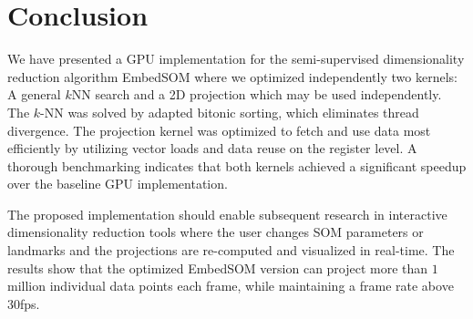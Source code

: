 \section{Conclusion}\label{sec:outro}

We have presented a GPU implementation for the semi-supervised dimensionality reduction algorithm EmbedSOM where we optimized independently two kernels: A general $k$NN search and a 2D projection which may be used independently. The $k$-NN was solved by adapted bitonic sorting, which eliminates thread divergence. The projection kernel was optimized to fetch and use data most efficiently by utilizing vector loads and data reuse on the register level. A thorough benchmarking indicates that both kernels achieved a significant speedup over the baseline GPU implementation.

The proposed implementation should enable subsequent research in interactive dimensionality reduction tools where the user changes SOM parameters or landmarks and the projections are re-computed and visualized in real-time. The results show that the optimized EmbedSOM version can project more than $1$ million individual data points each frame, while maintaining a frame rate above 30fps. 






